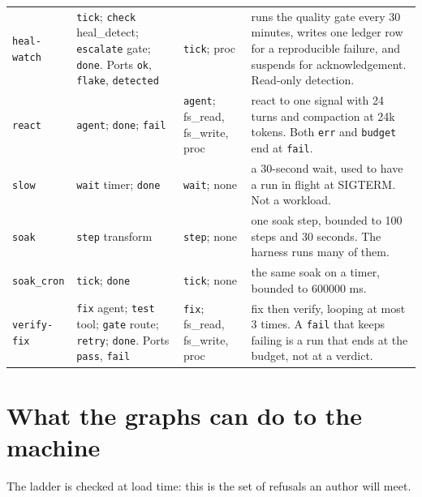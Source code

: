 {\begin{longtable}{@{}>{\raggedright\arraybackslash}p{}>{\raggedright\arraybackslash}p{}>{\raggedright\arraybackslash}p{}>{\raggedright\arraybackslash}p{}@{}}
  \texttt{heal-watch} & \texttt{tick}; \texttt{check} heal\_detect; \texttt{escalate} gate;
    \texttt{done}. Ports \texttt{ok}, \texttt{flake}, \texttt{detected} & \texttt{tick};
    proc & runs the quality gate every 30 minutes, writes one ledger row for a reproducible
    failure, and suspends for acknowledgement. Read-only detection. \\
  \texttt{react} & \texttt{agent}; \texttt{done}; \texttt{fail} & \texttt{agent}; fs\_read,
    fs\_write, proc & react to one signal with 24 turns and compaction at 24k tokens. Both
    \texttt{err} and \texttt{budget} end at \texttt{fail}. \\
  \texttt{slow} & \texttt{wait} timer; \texttt{done} & \texttt{wait}; none & a 30-second wait,
    used to have a run in flight at SIGTERM. Not a workload. \\
  \texttt{soak} & \texttt{step} transform & \texttt{step}; none & one soak step, bounded to
    100 steps and 30 seconds. The harness runs many of them. \\
  \texttt{soak\_cron} & \texttt{tick}; \texttt{done} & \texttt{tick}; none & the same soak on
    a timer, bounded to 600000 ms. \\
  \texttt{verify-fix} & \texttt{fix} agent; \texttt{test} tool; \texttt{gate} route;
    \texttt{retry}; \texttt{done}. Ports \texttt{pass}, \texttt{fail} & \texttt{fix};
    fs\_read, fs\_write, proc & fix then verify, looping at most 3 times. A \texttt{fail}
    that keeps failing is a run that ends at the budget, not at a verdict. \\
  \bottomrule
\end{longtable}
}

\section{What the graphs can do to the machine}

The ladder is checked at load time: this is the set of refusals an author will meet.

